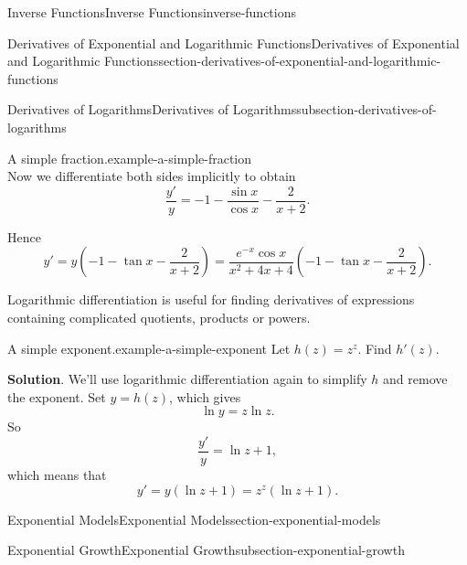 \documentclass[oneside,10pt,]{book}
\numberwithin{equation}{section}
\begin{document}
\begin{chapterptx}{Inverse Functions}{}{Inverse Functions}{}{}{inverse-functions}
\begin{sectionptx}{Derivatives of Exponential and Logarithmic Functions}{}{Derivatives of Exponential and Logarithmic Functions}{}{}{section-derivatives-of-exponential-and-logarithmic-functions}
\begin{subsectionptx}{Derivatives of Logarithms}{}{Derivatives of Logarithms}{}{}{subsection-derivatives-of-logarithms}
\begin{example}{A simple fraction.}{example-a-simple-fraction}
\begin{equation*}
\end{equation*}
Now we differentiate both sides implicitly to obtain%
\begin{equation*}
\frac{y'}{y} = -1 - \frac{\sin x}{\cos x} - \frac{2}{x+2}.
\end{equation*}
%
\par
\hypertarget{p-242}{}%
Hence%
\begin{equation*}
y' = y\left(-1 - \tan x - \frac{2}{x+2}\right) = \frac{e^{-x}\cos x}{x^{2} + 4x + 4}\left(-1 - \tan x - \frac{2}{x+2}\right).
\end{equation*}
%
\end{example}
\hypertarget{p-243}{}%
Logarithmic differentiation is useful for finding derivatives of expressions containing complicated quotients, products or powers.%
\begin{example}{A simple exponent.}{example-a-simple-exponent}%
\hypertarget{p-244}{}%
Let \(h(z) = z^{z}\). Find \(h'(z)\).%
\par\smallskip%
\noindent\textbf{Solution}.\hypertarget{solution-53}{}\quad%
\hypertarget{p-245}{}%
We'll use logarithmic differentiation again to simplify \(h\) and remove the exponent. Set \(y = h(z)\), which gives%
\begin{equation*}
\ln y = z\ln z.
\end{equation*}
So%
\begin{equation*}
\frac{y'}{y} = \ln z + 1,
\end{equation*}
which means that%
\begin{equation*}
y' = y(\ln z + 1) = z^{z}(\ln z + 1).
\end{equation*}
%
\end{example}
\end{subsectionptx}
\end{sectionptx}
%
%
\typeout{************************************************}
\typeout{************************************************}
%
\begin{sectionptx}{Exponential Models}{}{Exponential Models}{}{}{section-exponential-models}
%
%
\typeout{************************************************}
\typeout{************************************************}
%
\begin{subsectionptx}{Exponential Growth}{}{Exponential Growth}{}{}{subsection-exponential-growth}
\hypertarget{p-246}{}%

\end{subsectionptx}
\end{sectionptx}
\end{chapterptx}
\end{document}
